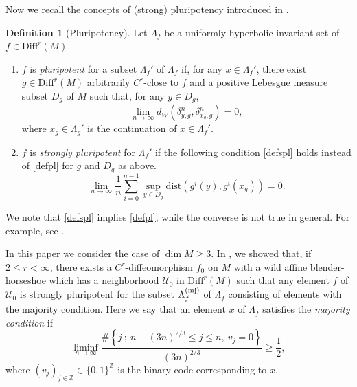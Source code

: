 \documentclass{amsart}
\theoremstyle{plain}
\theoremstyle{definition}
\newtheorem{dfn}[thm]{Definition}
\numberwithin{equation}{section}
\numberwithin{figure}{section}
\def\diff{\mathrm{Diff}}
\begin{document}
Now we recall the concepts of (strong) pluripotency introduced in \cite{KNS}.


\begin{dfn}[Pluripotency]\label{dfn1}
Let $\Lambda_f $ be a uniformly hyperbolic invariant set of $f \in \diff^{r}(M)$.
\begin{enumerate}[(1)] 
\item $f$  is \emph{pluripotent} for  a subset $\Lambda_f'$ of $\Lambda_f$ if, for any $x\in \Lambda_f'$,  
there exist $g \in \diff^r(M)$ arbitrarily $C^r$-close to $f$ and 
a positive Lebesgue measure subset $D_g$ of $M$ such that, 
for any $y\in D_g$, 
\begin{equation}\label{defpl}
\lim _{n\to \infty} d_W( \delta_{y,g}^n, \delta_{x_g,g}^n ) =0,
\end{equation}
where $x_g\in \Lambda_g'$ is the continuation of $x\in \Lambda_f'$. 
\item
$f$ is \emph{strongly pluripotent} for $\Lambda_f'$ if the 
following condition \eqref{defspl} holds instead of \eqref{defpl} for $g$ and $D_g$ as above.
\begin{equation}\label{defspl}
\lim _{n\to \infty} 
\frac{1}{n}\sum_{i=0}^{n-1}
\sup_{y\in D_{g}}\mathrm{dist}(g^i(y),g^i(x_{g}))=0.
\end{equation}
\end{enumerate}
\end{dfn}
We note that \eqref{defspl} implies \eqref{defpl}, while the converse is not true in 
general.
For example, see \cite[Theorem 1.8]{KNS}.



In this paper we consider the case of $\dim M\geq 3$.
In \cite[Theorem B]{KNS}, we showed that, if $2\leq r<\infty$,  
there exists a $C^r$-diffeomorphism $f_0$ on $M$ with a wild affine blender-horseshoe 
which has a neighborhood $\mathcal{U}_0$ in $\diff^r(M)$ such that 
any element $f$ of $\mathcal{U}_0$ is strongly pluripotent for 
the subset $\Lambda_f^{(\rm mj)}$ of 
$\Lambda_f$ consisting of elements with the majority condition.
Here we say that an element $x$ of $\Lambda_f$ satisfies the \emph{majority condition} if 
\begin{equation}\label{eqn_majority}
\liminf_{n\to\infty}\frac{
\#\left\{
j\ ;\ 
n- (3n)^{2/3} \leq j\leq n,\ 
v_{j}=0
\right\}
}{(3n)^{2/3}}\geq \frac12,
\end{equation}
where 
$(v_j)_{j\in \mathbb{Z}}\in \{0,1\}^{\mathbb{Z}}$ is the binary code corresponding to $x$.
\end{document}
